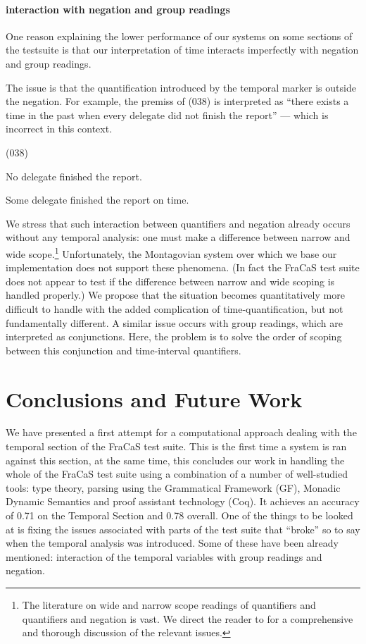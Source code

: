 \documentclass[a4paper,11pt]{article}
\newcommand\hyp{\item[H]}
\newcommand\fracasex[2]{\begin{lingex}\item[(#1)] \begin{subex} #2 \end{subex} \end{lingex} }
\begin{document}
\paragraph{interaction with negation and group readings}
One reason explaining the lower performance of our systems on some
sections of the testsuite is that our interpretation of time interacts
imperfectly with negation and group readings.

The issue is that the quantification introduced by the temporal marker
is outside the negation. For example, the premiss of (038) is
interpreted as ``there exists a time in the past when every delegate
did not finish the report'' --- which is incorrect in this context.
\fracasex{038}{
\item	No delegate finished the report.
\hyp 	Some delegate finished the report on time.
}
%
We stress that such interaction between quantifiers and negation
already occurs without any temporal analysis: one must make a difference
between narrow  and wide scope.\footnote{The literature on wide and narrow scope readings of quantifiers and quantifiers and negation is vast. We direct the reader to \cite{steedman:2012} for a comprehensive and thorough discussion of the relevant issues.} Unfortunately,
the Montagovian system over which we base our implementation does not
support these phenomena. (In fact the FraCaS test suite does not appear to
test if the difference between narrow and wide scoping is handled properly.)
We propose that the situation becomes
quantitatively more difficult to handle with the added complication of
time-quantification, but not fundamentally different.
%
A similar issue occurs with group readings, which are interpreted as
conjunctions. Here, the problem is to solve the order of scoping
between this conjunction and time-interval quantifiers.

\section{Conclusions and Future Work}
\label{sec:conclusion}

We have presented a first attempt for a computational approach dealing
with the temporal section of the FraCaS test suite. This is the first
time a system is ran against this section, at the same time, this
concludes our work in handling the whole of the FraCaS test suite
using a combination of a number of well-studied tools: type theory,
parsing using the Grammatical Framework (GF), Monadic Dynamic
Semantics and proof assistant technology (Coq). It achieves an
accuracy of 0.71 on the Temporal Section and 0.78 overall. One of the
things to be looked at is fixing the issues associated with parts of
the test suite that ``broke'' so to say when the temporal analysis was
introduced. Some of these have been already mentioned: interaction of
the temporal variables with group readings and negation.
\end{document}
